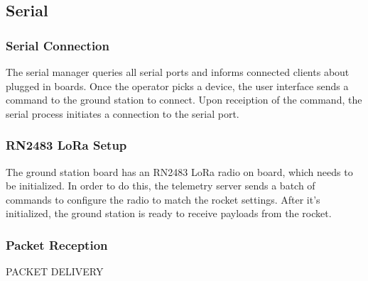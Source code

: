 \subsectionfont{\fontsize{14}{14}\selectfont}


\subsection{Serial}

\subsubsection{Serial Connection}
The serial manager queries all serial ports and informs connected clients about plugged in boards. 
Once the operator picks a device, the user interface sends a command to the ground station to connect. Upon receiption of the command, the serial process initiates a connection to the serial port.

\subsubsection{RN2483 LoRa Setup}
The ground station board has an RN2483 LoRa radio on board, which needs to be initialized. In order to do this, the telemetry server sends a batch of commands to configure the radio to match the rocket settings. After it's initialized, the ground station is ready to receive payloads from the rocket.

\subsubsection{Packet Reception}

PACKET DELIVERY\\
